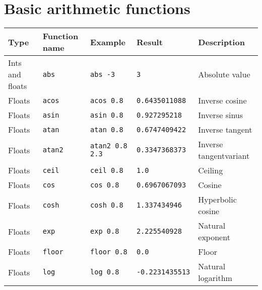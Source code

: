 \section{Basic arithmetic functions}
\begin{table}[ht]
  \centering
  \begin{tabular}{|l|l|l|l|l|}
    \hline
    \rowcolor{headerRowColor} Type & Function name & Example & Result & Description\\
    \hline
    Ints and floats & \lstinline!abs! & \lstinline!abs -3! & \lstinline!3! & Absolute value\\
    \hline 
    Floats & \lstinline!acos! & \lstinline!acos 0.8! & \lstinline!0.6435011088! & Inverse cosine\\
    \hline 
    Floats & \lstinline!asin! & \lstinline!asin 0.8! & \lstinline!0.927295218! & Inverse sinus\\
    \hline 
    Floats & \lstinline!atan! & \lstinline!atan 0.8! & \lstinline!0.6747409422! & Inverse tangent\\
    \hline 
    Floats & \lstinline!atan2! & \lstinline!atan2 0.8 2.3! & \lstinline!0.3347368373! & Inverse tangentvariant\\
    \hline 
    Floats & \lstinline!ceil! & \lstinline!ceil 0.8! & \lstinline!1.0! & Ceiling\\
    \hline 
    Floats & \lstinline!cos! & \lstinline!cos 0.8! & \lstinline!0.6967067093! & Cosine\\
    \hline 
    Floats & \lstinline!cosh! & \lstinline!cosh 0.8! & \lstinline!1.337434946! & Hyperbolic cosine\\
    \hline 
    Floats & \lstinline!exp! & \lstinline!exp 0.8! & \lstinline!2.225540928! & Natural exponent\\
    \hline 
    Floats & \lstinline!floor! & \lstinline!floor 0.8! & \lstinline!0.0! & Floor\\
    \hline 
    Floats & \lstinline!log! & \lstinline!log 0.8! & \lstinline!-0.2231435513! & Natural logarithm\\

\end{tabular}
\end{table}
